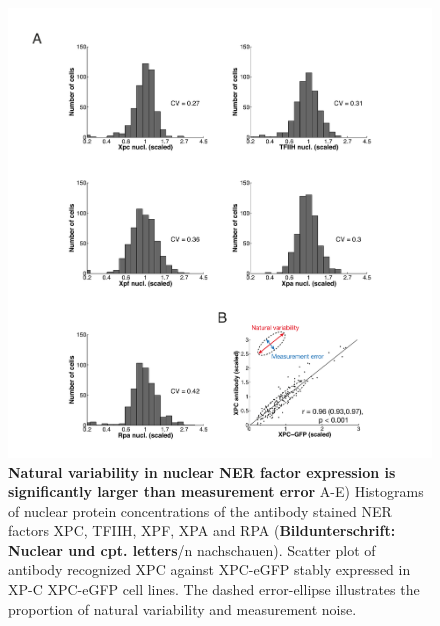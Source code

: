 \begin{figure}[htbp]
	\begin{center}
		\includegraphics[width=1\textwidth]{Abbildungen/figure3_2.pdf}
		\caption{\textbf{Natural variability in nuclear NER factor expression is significantly larger than measurement error} A-E) Histograms of nuclear protein concentrations of the antibody stained NER factors XPC, TFIIH, XPF, XPA and RPA (\textbf{Bildunterschrift: Nuclear und cpt. letters}/n nachschauen). Scatter plot of antibody recognized XPC against XPC-eGFP stably expressed in XP-C XPC-eGFP cell lines. The dashed error-ellipse illustrates the proportion of natural variability and measurement noise.}
		\label{fig:ProteinDist}
	\end{center}
\end{figure}

